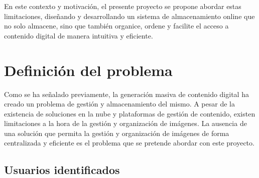 En este contexto y motivación, el presente proyecto se propone abordar estas limitaciones, diseñando y desarrollando un sistema de almacenamiento online que no solo almacene, 
sino que también organice, ordene y facilite el acceso a contenido digital de manera intuitiva y eficiente.

\section{Definición del problema}

Como se ha señalado previamente, la generación masiva de contenido digital ha creado un problema de gestión y almacenamiento del mismo. A pesar de la existencia de
soluciones en la nube y plataformas de gestión de contenido, existen limitaciones a la hora de la gestión y organización de imágenes. La ausencia de una solución que
permita la gestión y organización de imágenes de forma centralizada y eficiente es el problema que se pretende abordar con este proyecto.

    \subsection{Usuarios identificados}

